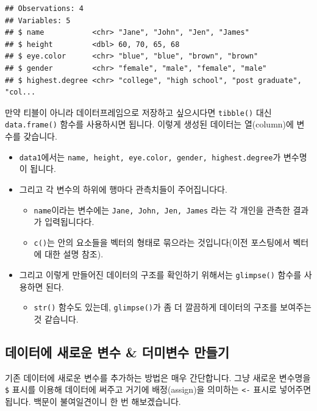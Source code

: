 \documentclass[]{book}
\providecommand{\tightlist}{%
  \setlength{\itemsep}{0pt}\setlength{\parskip}{0pt}}
\begin{document}
\begin{verbatim}
## Observations: 4
## Variables: 5
## $ name           <chr> "Jane", "John", "Jen", "James"
## $ height         <dbl> 60, 70, 65, 68
## $ eye.color      <chr> "blue", "blue", "brown", "brown"
## $ gender         <chr> "female", "male", "female", "male"
## $ highest.degree <chr> "college", "high school", "post graduate", "col...
\end{verbatim}

만약 티블이 아니라 데이터프레임으로 저장하고 싶으시다면 \texttt{tibble()} 대신 \texttt{data.frame()} 함수를 사용하시면 됩니다. 이렇게 생성된 데이터는 열(column)에 변수를 갖습니다.

\begin{itemize}
\tightlist
\item
  \texttt{data1}에서는 \texttt{name,\ height,\ eye.color,\ gender,\ highest.degree}가 변수명이 됩니다.
\item
  그리고 각 변수의 하위에 행마다 관측치들이 주어집니다다.

  \begin{itemize}
  \tightlist
  \item
    \texttt{name}이라는 변수에는 \texttt{Jane,\ John,\ Jen,\ James} 라는 각 개인을 관측한 결과가 입력됩니다다.
  \item
    \texttt{c()}는 안의 요소들을 벡터의 형태로 묶으라는 것입니다(이전 포스팅에서 벡터에 대한 설명 참조).
  \end{itemize}
\item
  그리고 이렇게 만들어진 데이터의 구조를 확인하기 위해서는 \texttt{glimpse()} 함수를 사용하면 된다.

  \begin{itemize}
  \tightlist
  \item
    \texttt{str()} 함수도 있는데, \texttt{glimpse()}가 좀 더 깔끔하게 데이터의 구조를 보여주는 것 같습니다.
  \end{itemize}
\end{itemize}

\hypertarget{uxb370uxc774uxd130uxc5d0-uxc0c8uxb85cuxc6b4-uxbcc0uxc218-uxb354uxbbf8uxbcc0uxc218-uxb9ccuxb4e4uxae30}{%
\subsection{데이터에 새로운 변수 \& 더미변수 만들기}\label{uxb370uxc774uxd130uxc5d0-uxc0c8uxb85cuxc6b4-uxbcc0uxc218-uxb354uxbbf8uxbcc0uxc218-uxb9ccuxb4e4uxae30}}

기존 데이터에 새로운 변수를 추가하는 방법은 매우 간단합니다. 그냥 새로운 변수명을 \texttt{\$} 표시를 이용해 데이터에 써주고 거기에 배정(assign)을 의미하는 \texttt{\textless{}-} 표시로 넣어주면 됩니다. 백문이 불여일견이니 한 번 해보겠습니다.
\end{document}
